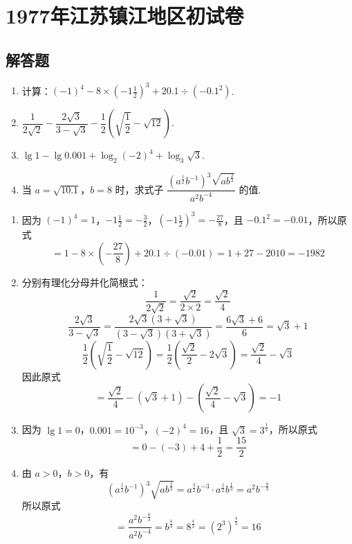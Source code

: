 \chapter{1977年江苏镇江地区初试卷}

\section{解答题}

\begin{problem}
\begin{enumerate}
\item 计算：\( \left(-1\right)^4 - 8\times\left(-1\frac{1}{2}\right)^3 + 20.1\div\left(-0.1^2\right) \).
\item \( \dfrac{1}{2\sqrt{2}}-\dfrac{2\sqrt{3}}{3-\sqrt{3}}-\dfrac{1}{2}\left(\sqrt{\dfrac{1}{2}}-\sqrt{12}\right) \).
\item \( \lg 1-\lg 0.001+\log_{2}\left(-2\right)^4+\log_{3}\sqrt{3} \).
\item 当 \( a=\sqrt{10.1} \)，\( b=8 \) 时，求式子 \( \dfrac{\left(a^{\frac{1}{2}}b^{-1}\right)^3\sqrt{a b^{\frac{2}{3}}}}{a^2b^{-4}} \) 的值.
\end{enumerate}
\end{problem}

\begin{solution}
\begin{enumerate}
\item 因为 \(\left(-1\right)^4=1\)，\(-1\frac{1}{2}=-\frac{3}{2}\)，\(\left(-1\frac{1}{2}\right)^3=-\frac{27}{8}\)，且 \(-0.1^2=-0.01\)，所以原式
\[
=1-8\times\left(-\frac{27}{8}\right)+20.1\div\left(-0.01\right)=1+27-2010=-1982
\]

\item 分别有理化分母并化简根式：
\[
\frac{1}{2\sqrt{2}}=\frac{\sqrt{2}}{2\times2}=\frac{\sqrt{2}}{4}
\]
\[
\frac{2\sqrt{3}}{3-\sqrt{3}}=\frac{2\sqrt{3}\left(3+\sqrt{3}\right)}{\left(3-\sqrt{3}\right)\left(3+\sqrt{3}\right)}=\frac{6\sqrt{3}+6}{6}=\sqrt{3}+1
\]
\[
\frac{1}{2}\left(\sqrt{\frac{1}{2}}-\sqrt{12}\right)=\frac{1}{2}\left(\frac{\sqrt{2}}{2}-2\sqrt{3}\right)=\frac{\sqrt{2}}{4}-\sqrt{3}
\]
因此原式
\[
=\frac{\sqrt{2}}{4}-\left(\sqrt{3}+1\right)-\left(\frac{\sqrt{2}}{4}-\sqrt{3}\right)=-1
\]

\item 因为 \(\lg1=0\)，\(0.001=10^{-3}\)，\((-2)^4=16\)，且 \(\sqrt{3}=3^{\frac{1}{2}}\)，所以原式
\[
=0-(-3)+4+\frac{1}{2}=\frac{15}{2}
\]

\item 由 \(a>0\)，\(b>0\)，有
\[
\left(a^{\frac{1}{2}}b^{-1}\right)^3\sqrt{a b^{\frac{2}{3}}}=a^{\frac{3}{2}}b^{-3}\cdot a^{\frac{1}{2}}b^{\frac{1}{3}}=a^2b^{-\frac{8}{3}}
\]
所以原式
\[
=\frac{a^2b^{-\frac{8}{3}}}{a^2b^{-4}}=b^{\frac{4}{3}}=8^{\frac{4}{3}}=\left(2^3\right)^{\frac{4}{3}}=16
\]
\end{enumerate}
\end{solution}

